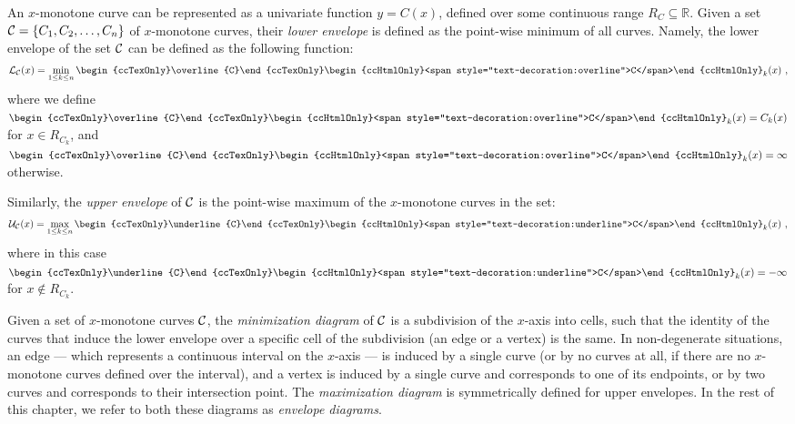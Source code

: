 An $x$-monotone curve can be represented as a univariate function
$y = C(x)$, defined over some continuous range $R_C \subseteq {\mathbb R}$.
Given a set ${\cal C} = \{ C_1, C_2, \ldots, C_n \}$ of $x$-monotone
curves, their {\em lower envelope} is defined as the point-wise minimum of
all curves. Namely, the lower envelope of the set ${\cal C}$ can be
defined as the following function:
\begin{eqnarray*}
{\cal L}_{{\cal C}} (x) = \min_{1 \leq k \leq n}{
\begin{ccTexOnly}\overline{C}\end{ccTexOnly}
\begin{ccHtmlOnly}<span style="text-decoration:overline">C</span>\end{ccHtmlOnly}
_k (x)} \ ,
\end{eqnarray*}
where we define $
\begin{ccTexOnly}\overline{C}\end{ccTexOnly}
\begin{ccHtmlOnly}<span style="text-decoration:overline">C</span>\end{ccHtmlOnly}
_k(x) = C_k(x)$ for $x \in R_{C_k}$,
and $
\begin{ccTexOnly}\overline{C}\end{ccTexOnly}
\begin{ccHtmlOnly}<span style="text-decoration:overline">C</span>\end{ccHtmlOnly}
_k(x) = \infty$ otherwise.

Similarly, the {\em upper envelope} of ${\cal C}$ is the point-wise maximum of
the $x$-monotone curves in the set:
\begin{eqnarray*}
{\cal U}_{{\cal C}} (x) = \max_{1 \leq k \leq n}{
\begin{ccTexOnly}\underline{C}\end{ccTexOnly}
\begin{ccHtmlOnly}<span style="text-decoration:underline">C</span>\end{ccHtmlOnly}
_k (x)} \ ,
\end{eqnarray*}
where in this case $
\begin{ccTexOnly}\underline{C}\end{ccTexOnly}
\begin{ccHtmlOnly}<span style="text-decoration:underline">C</span>\end{ccHtmlOnly}
_k(x) = -\infty$ for $x 
\not\in R_{C_k}$.

Given a set of $x$-monotone curves ${\cal C}$, the {\em minimization
diagram} of ${\cal C}$ is a subdivision of the $x$-axis into cells,
such that the identity of the curves that induce the lower envelope
over a specific cell of the subdivision (an edge or a vertex) is the
same. In non-degenerate situations, an edge --- which represents a
continuous interval on the $x$-axis --- is induced by a single
curve (or by no curves at all, if there are no $x$-monotone curves
defined over the interval), and a vertex is induced by a single curve
and corresponds to one of its endpoints, or by two curves and
corresponds to their intersection point.
The {\em maximization diagram} is symmetrically defined for upper envelopes.
In the rest of this chapter, we refer to both these diagrams as
{\em envelope diagrams}.

